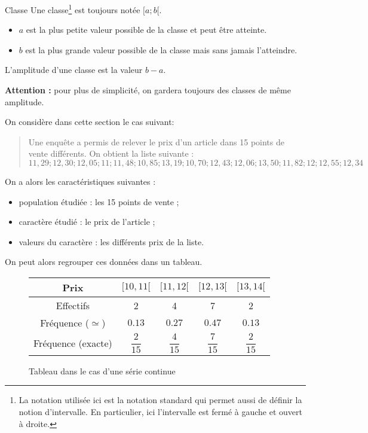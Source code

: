 \documentclass[titre=Stastistiques, classe=Troisième]{jeanmonnet}
\begin{document}
\begin{definition}{Classe}{}
	\renewcommand{\thefootnote}{\arabic{footnote}}
	Une classe\footnote{La notation utilisée ici est la notation standard qui permet aussi de définir la notion d'intervalle. En particulier, ici l'intervalle est \og fermé à gauche\fg{} et \og ouvert à droite\fg{}.} est toujours notée $[a;b[$. 
	\begin{itemize}
		\item $a$ est la plus petite valeur possible de la classe et peut être atteinte.
		\item $b$ est la plus grande valeur possible de la classe mais sans jamais l'atteindre.
	\end{itemize}
	L'amplitude d'une classe est la valeur $b-a$.
	
	\textbf{Attention :} pour plus de simplicité, on gardera toujours des classes de même amplitude.
\end{definition}

On considère dans cette section le cas suivant:
\begin{quote}
	Une enquête a permis de relever le prix d'un article dans 15 points de vente différents. On obtient la liste suivante :
	\[11,29 ; 12,30 ; 12,05; 11 ; 11,48 ; 10,85 ; 13,19 ; 10,70 ; 12,43 ; 12,06 ; 13,50 ; 11,82 ; 12 ; 12,55 ; 12,34\]
\end{quote}

On a alors les caractéristiques suivantes :
\begin{itemize}
	\item population étudiée : les 15 points de vente ;
	\item caractère étudié : le prix de l'article ;
	\item valeurs du caractère : les différents prix de la liste.
\end{itemize}

On peut alors regrouper ces données dans un tableau.

\begin{figure}[H]
	\centering
	\renewcommand{\arraystretch}{3}
	\begin{tabular}{|*{5}{c|}}
		\hline
		Prix & $[10,11[$&$[11,12[$&$[12,13[$&$[13,14[$\\
		\hline
		Effectifs & 2&4&7&2\\
		\hline
		Fréquence ($\simeq$) & $0.13$&$0.27$&$0.47$&$0.13$\\
		\hline
		Fréquence (exacte) & $\dfrac{2}{15}$&$\dfrac{4}{15}$&$\dfrac{7}{15}$&$\dfrac{2}{15}$\\
		\hline
	\end{tabular}
	\caption{Tableau dans le cas d'une série continue}
\end{figure}
\end{document}
